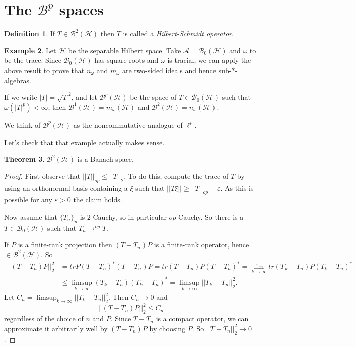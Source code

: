 \documentclass[12pt]{report}
\newcommand{\AAA}{\mathcal A}
\newcommand{\BB}{\mathcal B}
\newcommand{\HH}{\mathcal H}
\newcommand{\dfn}[1]{\emph{#1}\index{#1}}
\theoremstyle{definition}
\newtheorem{theorem}{Theorem}[chapter]
\newtheorem{definition}[theorem]{Definition}
\newtheorem{example}[theorem]{Example}
\begin{document}
\section{The $\BB^p$ spaces}
\begin{definition}
    If $T \in \BB^2(\HH)$ then $T$ is called a \dfn{Hilbert-Schmidt operator}.
\end{definition}
\begin{example}
    Let $\HH$ be the separable Hilbert space. Take $\AAA = \BB_0(\HH)$ and $\omega$ to be the trace. Since $\BB_0(\HH)$ has square roots and $\omega$ is tracial, we can apply the above result to prove that $n_\omega$ and $m_\omega$ are two-sided ideals and hence sub-$*$-algebras.

    If we write $|T| = \sqrt T^2$, and let $\BB^p(\HH)$ be the space of $T \in \BB_0(\HH)$ such that $\omega(|T|^p) < \infty$, then $\BB^1(\HH) = m_\omega(\HH)$ and $\BB^2(\HH) = n_\omega(\HH)$.

    We think of $\BB^p(\HH)$ as the noncommutative analogue of $\ell^p$.
\end{example}
Let's check that that example actually makes sense.
\begin{theorem}
    $\BB^2(\HH)$ is a Banach space.
\end{theorem}
\begin{proof}
    First observe that $||T||_{op} \leq ||T||_2$. To do this, compute the trace of $T$ by using an orthonormal basis containing a $\xi$ such that $||T\xi|| \geq ||T||_{op} - \varepsilon$. As this is possible for any $\varepsilon > 0$ the claim holds.

    Now assume that $\{T_n\}_n$ is $2$-Cauchy, so in particular $op$-Cauchy. So there is a $T \in \BB_0(\HH)$ such that $T_n \to^{op} T$.

    If $P$ is a finite-rank projection then $(T-T_n)P$ is a finite-rank operator, hence $\in \BB^2(\HH)$. So
\begin{align*}
    ||(T-T_n)P||_2^2
        &= tr P(T-T_n)^*(T-T_n)P
        = tr (T-T_n)P(T-T_n)^*
        = \lim_{k \to \infty} tr (T_k-T_n)P(T_k -T_n)^*\\
        &\leq \limsup_{k \to \infty} (T_k-T_n)(T_k-T_n)^*
        = \limsup_{k \to \infty} ||T_k-T_n||_2^2.
\end{align*}
Let $C_n = \limsup_{k \to \infty} ||T_k-T_n||_2^2$. Then $C_n \to 0$ and
$$||(T-T_n)P||_2^2 \leq C_n$$
regardless of the choice of $n$ and $P$. Since $T-T_n$ is a compact operator, we can approximate it arbitrarily well by $(T-T_n)P$ by choosing $P$. So $||T-T_n||_2^2 \to 0$.
\end{proof}
\end{document}
